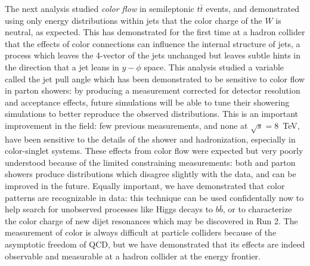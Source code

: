 The next analysis studied \textit{color flow} in semileptonic $t\bar{t}$ events, and demonstrated using only energy distributions within jets that the color charge of the $W$ is neutral, as expected. This has demonstrated for the first time at a hadron collider that the effects of color connections can influence the internal structure of jets, a process which leaves the 4-vector of the jets unchanged but leaves subtle hints in the direction that a jet leans in $y-\phi$ space. This analysis studied a variable called the jet pull angle which has been demonstrated to be sensitive to color flow in parton showers: by producing a measurement corrected for detector resolution and acceptance effects, future simulations will be able to tune their showering simulations to better reproduce the observed distributions. This is an important improvement in the field: few previous measurements, and none at $\sqrt{s} = 8$~TeV, have been sensitive to the details of the shower and hadronization, especially in color-singlet systems. These effects from color flow were expected but very poorly understood because of the limited constraining measurements: both \Pythia and \Herwigpp parton showers produce distributions which disagree slightly with the data, and can be improved in the future. Equally important, we have demonstrated that color patterns are recognizable in data: this technique can be used confidentally now to help search for unobserved processes like Higgs decays to $b\bar{b}$, or to characterize the color charge of new dijet resonances which may be discovered in Run 2. The measurement of color is always difficult at particle colliders because of the asymptotic freedom of QCD, but we have demonstrated that its effects are indeed observable and measurable at a hadron collider at the energy frontier.

